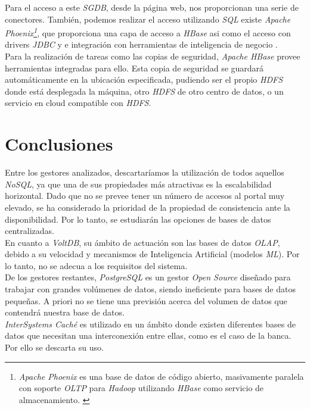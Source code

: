 \documentclass[3pt]{article}
\begin{document}
Para el acceso a este \emph{SGDB}, desde la página web, nos proporcionan una serie de conectores. También, podemos realizar el acceso utilizando \emph{SQL} existe \emph{Apache Phoenix\footnote{\emph{Apache Phoenix} es una base de datos de código abierto, masivamente paralela con soporte \emph{OLTP} para \emph{Hadoop} utilizando \emph{HBase} como servicio de almacenamiento. \cite{WIKI:11}}}, que proporciona una capa de acceso a \emph{HBase} asi como el acceso con drivers \emph{JDBC} y e integración con herramientas de inteligencia de negocio \cite{WIKI:8}. \\
Para la realización de tareas como las copias de seguridad, \emph{Apache HBase} provee herramientas integradas para ello. Esta copia de seguridad se guardará automáticamente en la ubicación especificada, pudiendo ser el propio \emph{HDFS} donde está desplegada la máquina, otro \emph{HDFS} de otro centro de datos, o un servicio en cloud compatible con \emph{HDFS}. \cite{AP:8}\\

\newpage

\section{Conclusiones}

Entre los gestores analizados, descartaríamos la utilización de todos aquellos \emph{NoSQL}, ya que una de sus propiedades más atractivas es la escalabilidad horizontal. Dado que no se prevee tener un número de accesos al portal muy elevado, se ha considerado la prioridad de la propiedad de consistencia ante la disponibilidad. Por lo tanto, se estudiarán las opciones de bases de datos centralizadas. \\

En cuanto a \emph{VoltDB}, su ámbito de actuación son las bases de datos \emph{OLAP}, debido a su velocidad y mecanismos de Inteligencia Artificial (modelos \emph{ML}). Por lo tanto, no se adecua a los requisitos del sistema. \\

De los gestores restantes, \emph{PostgreSQL} es un gestor \emph{Open Source} diseñado para trabajar con grandes volúmenes de datos, siendo ineficiente para bases de datos pequeñas. A priori no se tiene una previsión acerca del volumen de datos que contendrá nuestra base de datos.\\

\emph{InterSystems Caché} es utilizado en un ámbito donde existen diferentes bases de datos que necesitan una interconexión entre ellas, como es el caso de la banca. Por ello se descarta su uso.\\
\end{document}
